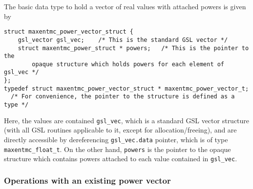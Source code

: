 \documentclass[12pt]{amsart}
\numberwithin{equation}{section}
\begin{document}
The basic data type to hold a vector of real values with attached
powers is given by
%
\begin{verbatim}
struct maxentmc_power_vector_struct {
    gsl_vector gsl_vec;    /* This is the standard GSL vector */
    struct maxentmc_power_struct * powers;   /* This is the pointer to the
        opaque structure which holds powers for each element of gsl_vec */
};
typedef struct maxentmc_power_vector_struct * maxentmc_power_vector_t;
  /* For convenience, the pointer to the structure is defined as a type */
\end{verbatim}
%
Here, the values are contained \texttt{gsl\_vec}, which is a standard
GSL vector structure (with all GSL routines applicable to it, except
for allocation/freeing), and are directly accessible by dereferencing
\texttt{gsl\_vec.data} pointer, which is of type
\texttt{maxentmc\_float\_t}. On the other hand, \texttt{powers} is the
pointer to the opaque structure which contains powers attached to each
value contained in \texttt{gsl\_vec}.

\subsubsection{Operations with an existing power vector}
\end{document}
